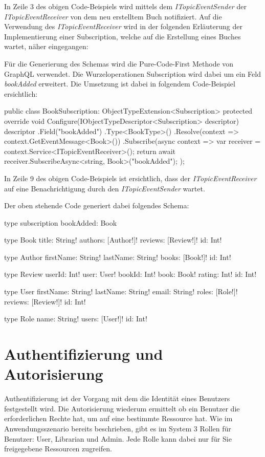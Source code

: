 In Zeile 3 des obigen Code-Beispiels wird mittels dem \textit{ITopicEventSender} der \textit{ITopicEventReceiver} von dem neu erstelltem Buch notifiziert.
Auf die Verwendung des \textit{ITopicEventReceiver} wird in der folgenden Erläuterung der Implementierung einer Subscription, welche auf die Erstellung eines Buches wartet, näher eingegangen:

Für die Generierung des Schemas wird die Pure-Code-First Methode von GraphQL verwendet.
Die Wurzeloperationen Subscription wird dabei um ein Feld \textit{bookAdded} erweitert.
Die Umsetzung ist dabei in folgendem Code-Beispiel ersichtlich:

\begin{JsCode}
public class BookSubscription: ObjectTypeExtension<Subscription> {
    protected override void Configure(IObjectTypeDescriptor<Subscription> descriptor) {
        descriptor
        .Field("bookAdded")
        .Type<BookType>()
        .Resolve(context => context.GetEventMessage<Book>())
        .Subscribe(async context => {
            var receiver = context.Service<ITopicEventReceiver>();
            return await receiver.SubscribeAsync<string, Book>("bookAdded");
        });
    }
}    
\end{JsCode}
In Zeile 9 des obigen Code-Beispiels ist ersichtlich, dass der \textit{ITopicEventReceiver} auf eine Benachrichtigung durch den \textit{ITopicEventSender} wartet.

Der oben stehende Code generiert dabei folgendes Schema:
\begin{JsCode}
type subscription{
    bookAdded: Book
}

type Book {
  title: String!
  authors: [Author!]!
  reviews: [Review!]!
  id: Int!
}

type Author {
  firstName: String!
  lastName: String!
  books: [Book!]!
  id: Int!
}

type Review {
  userId: Int!
  user: User!
  bookId: Int!
  book: Book!
  rating: Int!
  id: Int!
}

type User {
  firstName: String!
  lastName: String!
  email: String!
  roles: [Role!]!
  reviews: [Review!]!
  id: Int!
}

type Role {
  name: String!
  users: [User!]!
  id: Int!
}
\end{JsCode} 



\section{Authentifizierung und Autorisierung}
Authentifizierung ist der Vorgang mit dem die Identität eines Benutzers festgestellt wird.
Die Autorisierung wiederum ermittelt ob ein Benutzer die erforderlichen Rechte hat, um auf eine bestimmte Ressource hat.
Wie im Anwendungsszenario bereits beschrieben, gibt es im System 3 Rollen für Benutzer: User, Librarian und Admin.
Jede Rolle kann dabei nur für Sie freigegebene Ressourcen zugreifen.
\newline

